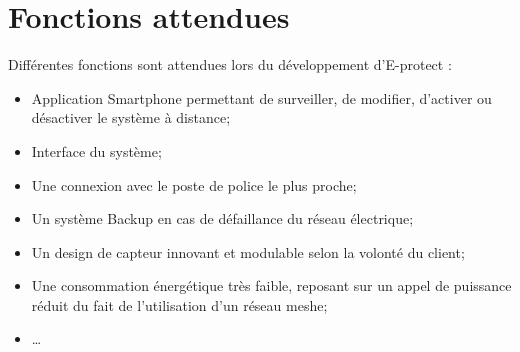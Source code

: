 \section{Fonctions attendues}

Différentes fonctions sont attendues lors du développement d’E-protect :
\begin{itemize}
\item Application Smartphone permettant de surveiller, de modifier, d’activer ou désactiver le système à distance;
\item Interface du système;
\item Une connexion avec le poste de police le plus proche;
\item Un système Backup en cas de défaillance du réseau électrique;
\item Un design de capteur innovant et modulable selon la volonté du client;
\item Une consommation énergétique très faible, reposant sur un appel de puissance réduit du fait de l’utilisation d’un réseau meshe;
\item … 
\end{itemize}
